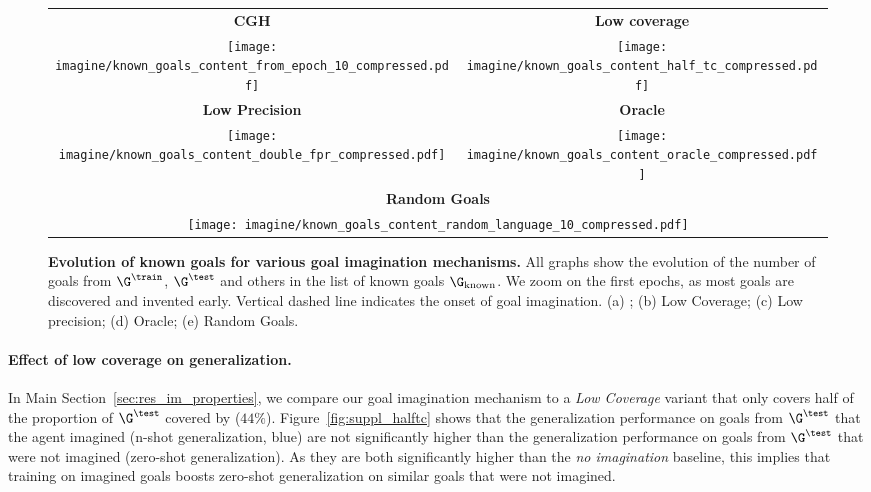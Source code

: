 \begin{figure}[!h]
\centering
\begin{tabular}{cc}

\textbf{CGH} & \textbf{Low coverage}\\
\texttt{[image: imagine/known\_goals\_content\_from\_epoch\_10\_compressed.pdf]} & \texttt{[image: imagine/known\_goals\_content\_half\_tc\_compressed.pdf]} \\
\textbf{Low Precision} & \textbf{Oracle}\\
\texttt{[image: imagine/known\_goals\_content\_double\_fpr\_compressed.pdf]} & \texttt{[image: imagine/known\_goals\_content\_oracle\_compressed.pdf]} \\
\multicolumn{2}{c}{\textbf{Random Goals}}\\
\multicolumn{2}{c}{\texttt{[image: imagine/known\_goals\_content\_random\_language\_10\_compressed.pdf]}}

	
\end{tabular}

      \caption{\textbf{Evolution of known goals for various goal imagination mechanisms.} All graphs show the evolution of the number of goals from $\G^\train$, $\G^\test$ and others in the list of known goals $\G_\text{known}$. We zoom on the first epochs, as most goals are discovered and invented early. Vertical dashed line indicates the onset of goal imagination. (a) \CGH; (b) Low Coverage; (c) Low precision; (d) Oracle; (e) Random Goals. \label{fig:suppl_known_goals}}
\end{figure} 

\newpage
\paragraph{Effect of low coverage on generalization.}
In Main Section~\ref{sec:res_im_properties}, we compare our goal imagination mechanism to a \textit{Low Coverage} variant that only covers half of the proportion of $\G^\test$ covered by \CGH ($44\%$). Figure~\ref{fig:suppl_halftc} shows that the generalization performance on goals from $\G^\test$ that the agent imagined (n-shot generalization, blue) are not significantly higher than the generalization performance on goals from $\G^\test$ that were not imagined (zero-shot generalization). As they are both significantly higher than the \textit{no imagination} baseline, this implies that training on imagined goals boosts zero-shot generalization on similar goals that were not imagined. 


